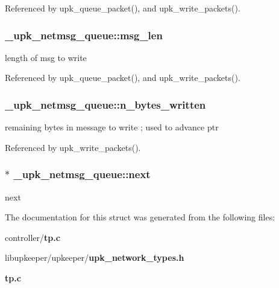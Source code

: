 Referenced by upk\_\-queue\_\-packet(), and upk\_\-write\_\-packets().

\subsubsection[{msg\_\-len}]{ {\bf \_\-upk\_\-netmsg\_\-queue::msg\_\-len}}\label{struct__upk__netmsg__queue_a72d42bbdbfdd3281240ba032a478072c}
length of msg to write 

Referenced by upk\_\-queue\_\-packet(), and upk\_\-write\_\-packets().

\subsubsection[{n\_\-bytes\_\-written}]{ {\bf \_\-upk\_\-netmsg\_\-queue::n\_\-bytes\_\-written}}\label{struct__upk__netmsg__queue_afd55858a2d41feebd6a484c238df816b}
remaining bytes in message to write ; used to advance ptr 

Referenced by upk\_\-write\_\-packets().

\subsubsection[{next}]{ $\ast$ {\bf \_\-upk\_\-netmsg\_\-queue::next}}\label{struct__upk__netmsg__queue_a5366fc1aeebe39634cfc00d779b8b308}
next 

The documentation for this struct was generated from the following files:\begin{DoxyCompactItemize}
\item 
controller/{\bf tp.c}\item 
libupkeeper/upkeeper/{\bf upk\_\-network\_\-types.h}\item 
{\bf tp.c}\end{DoxyCompactItemize}
